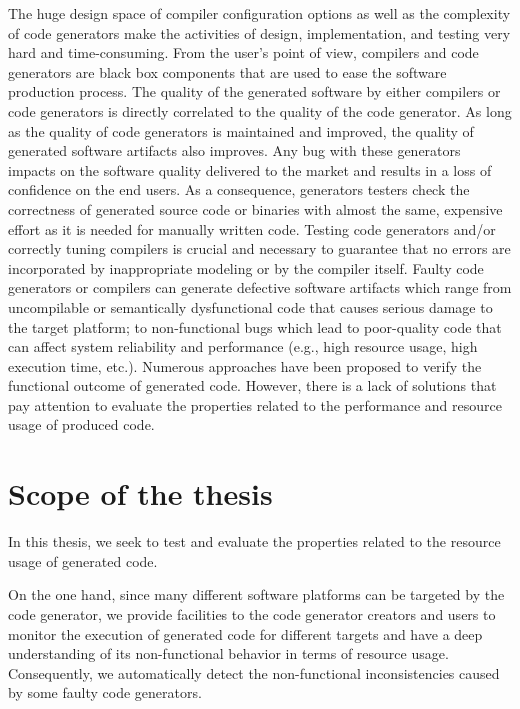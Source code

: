 The huge design space of compiler configuration options as well as the complexity of code generators make the activities of design, implementation, and testing very hard and time-consuming\cite{guana2015developers}.
From the user's point of view, compilers and code generators are black box components that are used to ease the software production process. The quality of the generated software by either compilers or code generators is directly correlated to the quality of the code generator. As long as the quality of code generators is maintained and improved, the quality of generated software artifacts also improves. Any bug with these generators impacts on the software quality delivered to the market and results in a loss of confidence on the end users.
As a consequence, generators testers check the correctness of generated source code or binaries with almost the same, expensive effort as it is needed for manually written code. 
Testing code generators and/or correctly tuning compilers is crucial and necessary to guarantee that no errors are incorporated by inappropriate modeling or by the compiler itself.
Faulty code generators or compilers can generate defective software artifacts which range from uncompilable or semantically dysfunctional code that causes serious damage to the target platform; to non-functional bugs which lead to poor-quality code that can affect system reliability and performance (e.g., high resource usage, high execution time, etc.). 
Numerous approaches have been proposed\cite{stuermer2007systematic,yang2011finding} to verify the functional outcome of generated code. However, there is a lack of solutions that pay attention to evaluate the properties related to the performance and resource usage of produced code.


\section{Scope of the thesis}

In this thesis, we seek to test and evaluate the properties related to the resource usage of generated code. 

On the one hand, since many different software platforms can be targeted by the code generator, we provide facilities to the code generator creators and users to monitor the execution of generated code for different targets and have a deep understanding of its non-functional behavior in terms of resource usage. Consequently, we automatically detect the non-functional inconsistencies caused by some faulty code generators. 


